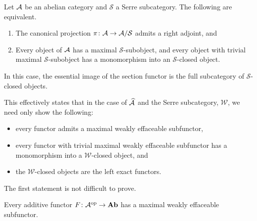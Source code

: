 \documentclass[reqno, 12pt]{amsart}
\begin{document}
\begin{theorem}
  Let $\mathcal{A}$ be an abelian category and $\mathcal{S}$ a Serre subcategory.
  The following are equivalent.
  \begin{enumerate}
  \item
    The canonical projection $\pi \colon \mathcal{A} \to \mathcal{A}/\mathcal{S}$ admits a right adjoint, and
  \item
    Every object of $\mathcal{A}$ has a maximal $\mathcal{S}$-subobject, and every object with trivial maximal $\mathcal{S}$-subobject has a monomorphism into an $\mathcal{S}$-closed object.
  \end{enumerate}
  In this case, the essential image of the section functor is the full subcategory of $\mathcal{S}$-closed objects.
\end{theorem}

This effectively states that in the case of $\widehat{\mathcal{A}}$ and the Serre subcategory, $\mathcal{W}$, we need only show the following:
\begin{itemize}
\item
  every functor admits a maximal weakly effaceable subfunctor,
\item
  every functor with trivial maximal weakly effaceable subfunctor has a monomorphism into a $\mathcal{W}$-closed object, and
\item
  the $\mathcal{W}$-closed objects are the left exact functors.
\end{itemize}

The first statement is not difficult to prove.
\begin{proposition}
  Every additive functor $F \colon \mathcal{A}^{\operatorname{op}} \to \operatorname{\bf Ab}$ has a maximal weakly effaceable subfunctor.
\end{proposition}
\end{document}
